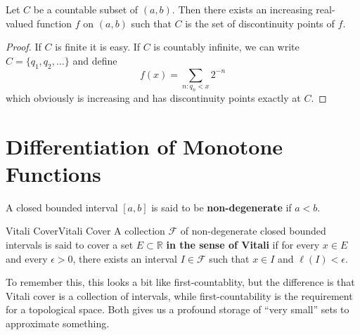 \documentclass[../main.tex]{subfiles}
\begin{document}
\begin{proposition}{}{}
  Let $C$ be a countable subset of $(a,b)$. Then there exists an increasing real-valued function $f$ on $(a,b)$ such that $C$ is the set of discontinuity points of $f$.
\end{proposition}
\begin{proof}
  If $C$ is finite it is easy. If $C$ is countably infinite, we can write $C = \{q_1, q_2, \ldots\}$ and define
  \begin{equation}
    f(x) = \sum_{n: q_n < x} 2^{-n}
  \end{equation}
  which obviously is increasing and has discontinuity points exactly at $C$.
\end{proof}

\section{Differentiation of Monotone Functions}

A closed bounded interval $[a,b]$ is said to be \textbf{non-degenerate} if $a < b$.

\begin{definition}{Vitali Cover}{Vitali Cover}
  A collection $\mathcal{F}$ of non-degenerate closed bounded intervals is said to cover a set $E \subset \mathbb{R}$ \textbf{in the sense of Vitali} if for every $x \in E$ and every $\epsilon > 0$, there exists an interval $I \in \mathcal{F}$ such that $x \in I$ and $\ell(I) < \epsilon$.
\end{definition}

\begin{remark}
  To remember this, this looks a bit like first-countablity, but the difference is that Vitali cover is a collection of intervals, while first-countability is the requirement for a topological space. Both gives us a profound storage of ``very small'' sets to approximate something.
\end{remark}
\end{document}

